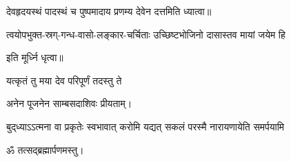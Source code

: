  देवहृदयस्थं पादस्थं च पुष्पमादाय प्रणम्य देवेन दत्तमिति ध्यात्वा॥

{त्वयोपभुक्त-स्रग्-गन्ध-वासो-लङ्कार-चर्चिताः}
{उच्छिष्टभोजिनो दासास्तव मायां जयेम हि}

इति मूर्ध्नि धृत्वा॥

{यत्कृतं तु मया देव परिपूर्णं तदस्तु ते}


अनेन पूजनेन साम्बसदाशिवः प्रीयताम्। 

{बुद्‌ध्याऽऽत्मना वा प्रकृतेः स्वभावात्}
{करोमि यद्यत् सकलं परस्मै}
{नारायणायेति समर्पयामि}


ॐ तत्सद्ब्रह्मार्पणमस्तु।\medskip
